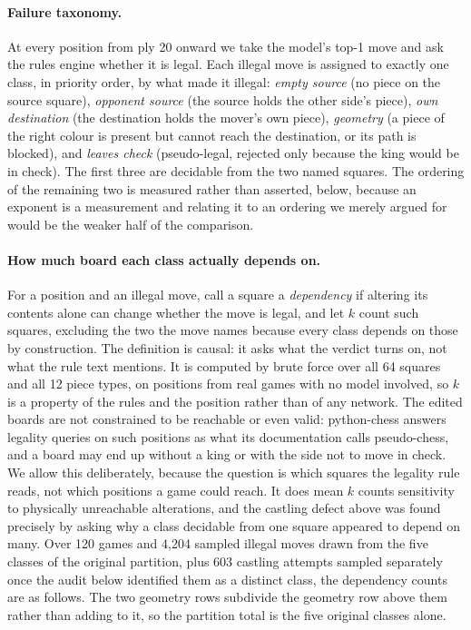 \documentclass[11pt]{article}
\begin{document}
\paragraph{Failure taxonomy.}
At every position from ply 20 onward we take the model's top-1 move and ask the
rules engine whether it is legal. Each illegal move is assigned to exactly one
class, in priority order, by what made it illegal:
\emph{empty source} (no piece on the source square),
\emph{opponent source} (the source holds the other side's piece),
\emph{own destination} (the destination holds the mover's own piece),
\emph{geometry} (a piece of the right colour is present but cannot reach the
destination, or its path is blocked), and
\emph{leaves check} (pseudo-legal, rejected only because the king would be in
check). The first three are decidable from the two named squares. The ordering
of the remaining two is measured rather than asserted, below, because an exponent
is a measurement and relating it to an ordering we merely argued for would be the
weaker half of the comparison.

\paragraph{How much board each class actually depends on.}
For a position and an illegal move, call a square a \emph{dependency} if altering
its contents alone can change whether the move is legal, and let $k$ count such
squares, excluding the two the move names because every class depends on those by
construction. The definition is causal: it asks what the verdict turns on, not what
the rule text mentions. It is computed by brute force over all 64 squares and all 12
piece types, on positions from real games with no model involved, so $k$ is a
property of the rules and the position rather than of any network. The edited boards
are not constrained to be reachable or even valid: python-chess answers legality
queries on such positions as what its documentation calls pseudo-chess, and a board
may end up without a king or with the side not to move in check. We allow this
deliberately, because the question is which squares the legality rule reads, not which
positions a game could reach. It does mean $k$ counts sensitivity to physically
unreachable alterations, and the castling defect above was found precisely by asking
why a class decidable from one square appeared to depend on many. Over 120 games
and 4,204 sampled illegal moves drawn from the five classes of the original
partition, plus 603 castling attempts sampled separately once the audit below
identified them as a distinct class, the dependency counts are as follows. The two
geometry rows subdivide the geometry row above them rather than adding to it, so the
partition total is the five original classes alone.
\end{document}
